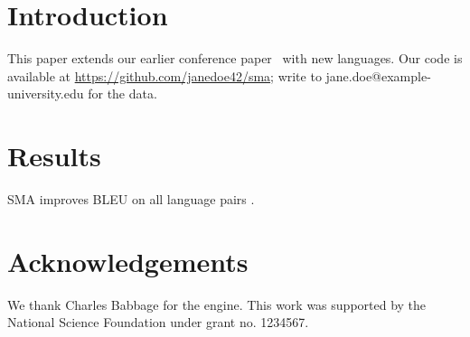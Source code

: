 \documentclass{article}
\begin{document}

\begin{abstract}
We introduce sparse mixture adapters (SMA) for low-resource translation.
\end{abstract}

\section{Introduction}
This paper extends our earlier conference paper~\cite{doe2023fast} with new languages.
Our code is available at \url{https://github.com/janedoe42/sma}; write to jane.doe@example-university.edu for the data.

\section{Results}
SMA improves BLEU on all language pairs .

\section*{Acknowledgements}
We thank Charles Babbage for the engine. This work was supported by the National Science Foundation under
grant no. 1234567.



\end{document}
